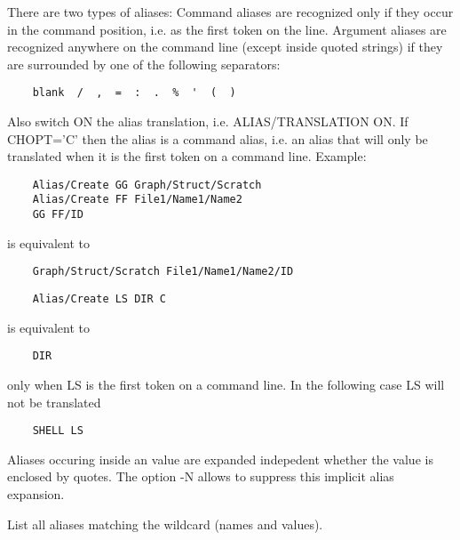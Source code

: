    \par
There are two types of aliases:  Command aliases are recognized only if 
   they occur in the command position, i.e. as the first token on the line.  
   Argument aliases are recognized anywhere on the command line (except inside 
   quoted strings) if they are surrounded by one of the following separators:  
\begin{verbatim}
    blank  /  ,  =  :  .  %  '  (  )
\end{verbatim}
\ENDVERB
   \par
Also switch ON the alias translation, i.e. ALIAS/TRANSLATION ON.  If 
   CHOPT='C' then the alias is a command alias, i.e. an alias that will only 
   be translated when it is the first token on a command line.  Example:  
\begin{verbatim}
    Alias/Create GG Graph/Struct/Scratch
    Alias/Create FF File1/Name1/Name2
    GG FF/ID
\end{verbatim}
   \par
is equivalent to 
\begin{verbatim}
    Graph/Struct/Scratch File1/Name1/Name2/ID
\end{verbatim}
\begin{verbatim}
    Alias/Create LS DIR C
\end{verbatim}
   \par
is equivalent to 
\begin{verbatim}
    DIR
\end{verbatim}
   \par
only when LS is the first token on a command line.  In the following case 
   LS will not be translated 
\begin{verbatim}
    SHELL LS
\end{verbatim}
\ENDVERB
   \par
Aliases occuring inside an value are expanded indepedent whether the value 
   is enclosed by quotes.  The option -N allows to suppress this implicit 
   alias expansion.  

\ENDCMD


\BEGARG
{}
\ENDARG

   \par
List all aliases matching the wildcard (names and values).  

\ENDCMD


